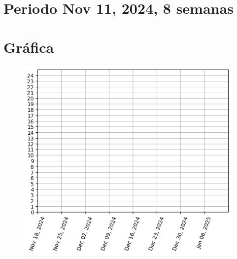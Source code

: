 \documentclass[a4paper,12pt, tikz]{scrartcl}
\begin{document}
 
\section*{Periodo Nov 11, 2024, 8 semanas }

\newpage

\section*{Gráfica}

\begin{figure}[H]
\centering
\includegraphics[scale=1]{graph.png}
\end{figure}

  \newpage
  $\;$
  \newpage
\end{document}
